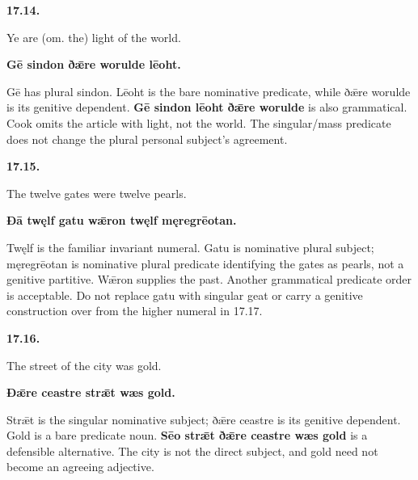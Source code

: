\par\begin{minipage}{\linewidth}\raggedright
\textbf{17.14.}

Ye are (om. the) light of the world.

\textbf{Gē sindon ðǣre worulde lēoht.}

Gē has plural sindon. Lēoht is the bare nominative predicate, while ðǣre worulde is its genitive dependent. \textbf{Gē sindon lēoht ðǣre worulde} is also grammatical. Cook omits the article with light, not the world. The singular/\allowbreak{}mass predicate does not change the plural personal subject's agreement.

\end{minipage}\par\addvspace{4pt}

\par\begin{minipage}{\linewidth}\raggedright
\textbf{17.15.}

The twelve gates were twelve pearls.

\textbf{Ðā twęlf gatu wǣron twęlf męregrēotan.}

Twęlf is the familiar invariant numeral. Gatu is nominative plural subject; męregrēotan is nominative plural predicate identifying the gates as pearls, not a genitive partitive. Wǣron supplies the past. Another grammatical predicate order is acceptable. Do not replace gatu with singular geat or carry a genitive construction over from the higher numeral in 17.17.

\end{minipage}\par\addvspace{4pt}

\par\begin{minipage}{\linewidth}\raggedright
\textbf{17.16.}

The street of the city was gold.

\textbf{Ðǣre ceastre strǣt wæs gold.}

Strǣt is the singular nominative subject; ðǣre ceastre is its genitive dependent. Gold is a bare predicate noun. \textbf{Sēo strǣt ðǣre ceastre wæs gold} is a defensible alternative. The city is not the direct subject, and gold need not become an agreeing adjective.

\end{minipage}\par\addvspace{4pt}

